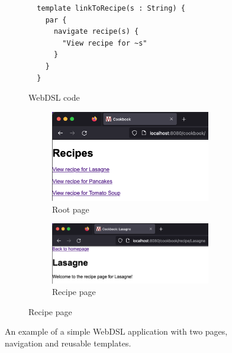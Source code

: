 \begin{figure}
\begin{subfigure}[t]{0.45\textwidth}
\begin{verbatim}
  template linkToRecipe(s : String) {
    par {
      navigate recipe(s) {
        "View recipe for ~s"
      }
    }
  }
          \end{verbatim}
          \caption{\label{fig:webdsl-pages-and-templates-webdsl}WebDSL code}
        \end{subfigure}
        \begin{subfigure}[t]{0.55\textwidth}
          \begin{subfigure}[t]{1\textwidth}
            \capstart
            \includegraphics[width=\textwidth]{../img/webdsl-pages-templates-root}
            \caption{\label{fig:webdsl-pages-and-templates-root-page}Root page}
          \end{subfigure}
          \begin{subfigure}[t]{1\textwidth}
            \capstart
            \includegraphics[width=\textwidth]{../img/webdsl-pages-templates-recipe}
            \caption{\label{fig:webdsl-pages-and-templates-recipe-page}Recipe page}
          \end{subfigure}
        \end{subfigure}
      \caption{\label{fig:webdsl-pages-and-templates}An example of a simple WebDSL application with two pages, navigation and reusable templates.}
      \end{figure}

